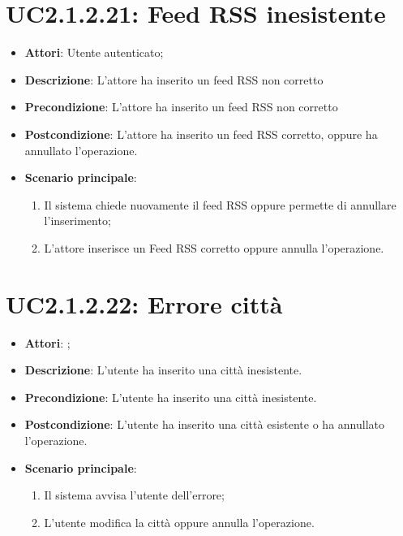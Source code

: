\section{UC2.1.2.21: Feed RSS inesistente}
\label{UC2.1.2.21}
\begin{itemize}
	\item \textbf{Attori}: Utente autenticato;
	\item \textbf{Descrizione}: L'attore ha inserito un feed RSS non corretto
	\item \textbf{Precondizione}: L'attore ha inserito un feed RSS non corretto
	\item \textbf{Postcondizione}: L'attore ha inserito un feed RSS corretto, oppure ha annullato l'operazione.
	\item \textbf{Scenario principale}:
	\begin{enumerate} \item Il sistema chiede nuovamente il feed RSS oppure permette di annullare l'inserimento;  \item  L'attore inserisce un Feed RSS corretto oppure annulla l'operazione.\end{enumerate}
\end{itemize}

\section{UC2.1.2.22: Errore città }
\label{UC2.1.2.22}
\begin{itemize}
	\item \textbf{Attori}: ;
	\item \textbf{Descrizione}: L'utente ha inserito una città inesistente. 
	\item \textbf{Precondizione}: L'utente ha inserito una città inesistente.
	\item \textbf{Postcondizione}: L'utente ha inserito una città esistente o ha annullato l'operazione.
	\item \textbf{Scenario principale}:
	\begin{enumerate} \item Il sistema avvisa l'utente dell'errore;  \item  L'utente modifica la città oppure annulla l'operazione.\end{enumerate}
\end{itemize}



